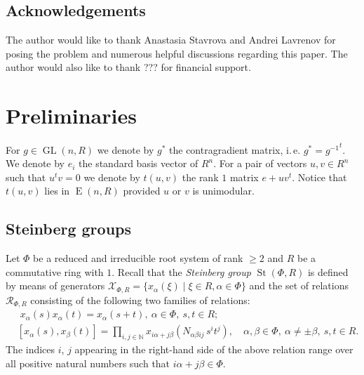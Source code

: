\documentclass[oneside, 10pt]{amsart}
\DeclareMathOperator{\St}{St}
\DeclareMathOperator{\E}{E}
\DeclareMathOperator{\GL}{GL}
\newcommand{\XX}{\mathcal{X}}           %
\newcommand{\RR}[1]{\mathcal{R}_{#1}}   %
\numberwithin{equation}{section}
\numberwithin{lemma}{section}
\theoremstyle{definition}
\theoremstyle{remark}
\begin{document}
\subsection{Acknowledgements}
The author would like to thank Anastasia Stavrova and Andrei Lavrenov for posing the problem and numerous helpful discussions regarding this paper.
The author would also like to thank ??? for financial support.

\section{Preliminaries}
\begin{comment}
Our notation and conventions follows~\cite[\S~4]{Vav09}.
Let $\Phi$ be an irreducible root system 

 that are uniquely determined by relations $\langle\varpi_i, \alpha_j^\vee \rangle = (\varpi_i, \alpha_j) = \delta_{ij}.$ %
\end{comment}

For $g\in \GL(n, R)$ we denote by $g^*$ the contragradient matrix, i.\,e. $g^* = {g^{-1}}^t$.
We denote by $e_i$ the standard basis vector of $R^n$. For a pair of vectors $u, v \in R^n$ such that $u^tv = 0$ we denote by
$t(u, v)$ the rank $1$ matrix $e + uv^t$. Notice that $t(u, v)$ lies in $\E(n, R)$ provided $u$ or $v$ is unimodular. %


\subsection{Steinberg groups}
Let $\Phi$ be a reduced and irreducible root system of rank $\geq 2$ and $R$ be a commutative ring with $1$.
Recall that the \emph{Steinberg group} $\St(\Phi, R)$ is defined by means of generators
$\XX_{\Phi, R} = \{x_{\alpha}(\xi) \mid \xi\in R, \alpha\in\Phi\}$ and the set of relations $\RR{\Phi, R}$ 
consisting of the following two families of relations:
\begin{align}
& \phantom{[}
x_\alpha(s) x_\alpha(t) = x_\alpha(s+t),\ \alpha\in\Phi,\ s,t\in R; \label{rel:add}\\
& [x_\alpha(s), x_\beta(t)] = \prod\limits_{i,j\in\mathbb{N}}
 x_{i\alpha + j\beta}\left(N_{\alpha\beta ij}\, s^i t^j\right),\quad \alpha,\beta\in\Phi,\ \alpha\neq\pm\beta,\ s,t\in R. \label{rel:CCF}
\end{align}
The indices $i$, $j$ appearing in the right-hand side of the above relation range over
all positive natural numbers such that $i\alpha + j\beta\in\Phi$.
\end{document}
